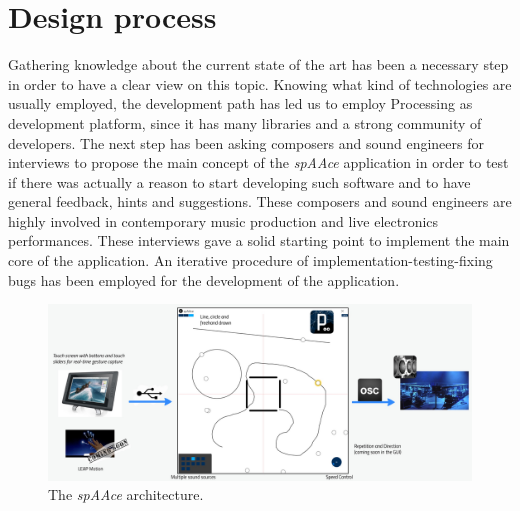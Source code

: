 \documentclass[journal]{IEEEtran}
\begin{document}
\section{Design process}
Gathering knowledge about the current state of the art has been a necessary step in order to have a clear view on this topic. Knowing what kind of technologies are usually employed, the development path has led us to employ Processing \cite{processing} as development platform, since it has many libraries and a strong community of developers. 
The next step has been asking composers and sound engineers for interviews to propose the main concept of the \emph{spAAce} application in order to test if there was actually a reason to start developing such software and to have general feedback, hints and suggestions. These composers and sound engineers are highly involved in contemporary music production and live electronics performances. These interviews gave a solid starting point to implement the main core of the application. An iterative procedure of implementation-testing-fixing bugs has been employed for the development of the application.



\begin{figure}
    \centering
    \includegraphics[scale = 0.2]{Architecture}
    \caption{The \textit{spAAce} architecture.}
    \label{fig:architecture}
\end{figure}
\end{document}
